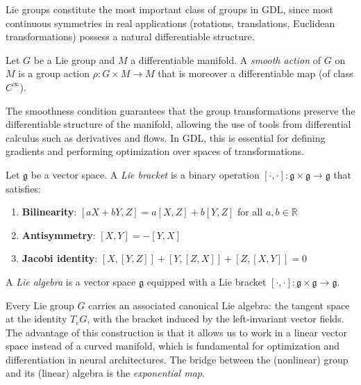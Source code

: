 Lie groups constitute the most important class of groups in \gls{GDL}, since most continuous symmetries in real applications (rotations, translations, Euclidean transformations) possess a natural differentiable structure.

\begin{definition}\label{def:accion_suave}
Let $G$ be a Lie group and $M$ a differentiable manifold. A \textit{smooth action} of $G$ on $M$ is a group action $\rho: G \times M \rightarrow M$ that is moreover a differentiable map (of class $C^\infty$).
\end{definition}

The smoothness condition guarantees that the group transformations preserve the differentiable structure of the manifold, allowing the use of tools from differential calculus such as derivatives and flows. In \gls{GDL}, this is essential for defining gradients and performing optimization over spaces of transformations.

\begin{definition}\label{def:corchete_lie}
Let $\mathfrak{g}$ be a vector space. A \textit{Lie bracket} is a binary operation $[\cdot, \cdot]: \mathfrak{g} \times \mathfrak{g} \rightarrow \mathfrak{g}$ that satisfies:
\begin{enumerate}
    \item \textbf{Bilinearity}: $[aX + bY, Z] = a[X,Z] + b[Y,Z]$ for all $a, b \in \mathbb{R}$
    \item \textbf{Antisymmetry}: $[X,Y] = -[Y,X]$
    \item \textbf{Jacobi identity}: $[X,[Y,Z]] + [Y,[Z,X]] + [Z,[X,Y]] = 0$
\end{enumerate}
\end{definition}

\begin{definition}\label{def:algebra_lie}
A \textit{Lie algebra} is a vector space $\mathfrak{g}$ equipped with a Lie bracket $[\cdot, \cdot]: \mathfrak{g} \times \mathfrak{g} \to \mathfrak{g}$.
\end{definition}

Every Lie group $G$ carries an associated canonical Lie algebra: the tangent space at the identity $T_e G$, with the bracket induced by the left-invariant vector fields. The advantage of this construction is that it allows us to work in a linear vector space instead of a curved manifold, which is fundamental for optimization and differentiation in neural architectures. The bridge between the (nonlinear) group and its (linear) algebra is the \textit{exponential map}.

